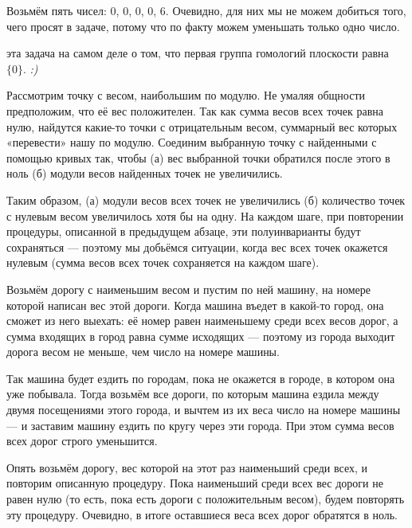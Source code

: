 \begin{itemize}
\itA Возьмём пять чисел: 0, 0, 0, 0, 6. Очевидно, для них мы не можем добиться того, чего просят в задаче, потому что по факту можем уменьшать только одно число.

 эта задача на самом деле о том, что первая группа гомологий плоскости равна $\{0\}$. {\it :)}

Рассмотрим точку с весом, наибольшим по модулю. Не умаляя общности предположим, что её вес положителен. Так как сумма весов всех точек равна нулю, найдутся какие-то точки с отрицательным весом, суммарный вес которых «перевести» нашу по модулю. Соединим выбранную точку с найденными с помощью кривых так, чтобы (а) вес выбранной точки обратился после этого в ноль (б) модули весов найденных точек не увеличились.

Таким образом, (а) модули весов всех точек не увеличились (б) количество точек с нулевым весом увеличилось хотя бы на одну. На каждом шаге, при повторении процедуры, описанной в предыдущем абзаце, эти полуинварианты будут сохраняться — поэтому мы добьёмся ситуации, когда вес всех точек окажется нулевым (сумма весов всех точек сохраняется на каждом шаге).

\itC Возьмём дорогу с наименьшим весом и пустим по ней машину, на номере которой написан вес этой дороги. Когда машина въедет в какой-то город, она сможет из него выехать: её номер равен наименьшему среди всех весов дорог, а сумма входящих в город равна сумме исходящих — поэтому из города выходит дорога весом не меньше, чем число на номере машины.

Так машина будет ездить по городам, пока не окажется в городе, в котором она уже побывала. Тогда возьмём все дороги, по которым машина ездила между двумя посещениями этого города, и вычтем из их веса число на номере машины — и заставим машину ездить по кругу через эти города. При этом сумма весов всех дорог строго уменьшится.

Опять возьмём дорогу, вес которой на этот раз наименьший среди всех, и повторим описанную процедуру. Пока наименьший среди всех вес дороги не равен нулю (то есть, пока есть дороги с положительным весом), будем повторять эту процедуру. Очевидно, в итоге оставшиеся веса всех дорог обратятся в ноль.
\end{itemize}